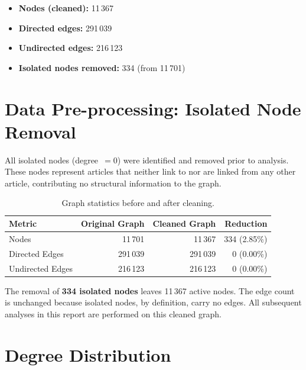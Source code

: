 \documentclass[12pt,a4paper]{article}
\begin{document}
\begin{itemize}
    \item \textbf{Nodes (cleaned):} 11\,367
    \item \textbf{Directed edges:} 291\,039
    \item \textbf{Undirected edges:} 216\,123
    \item \textbf{Isolated nodes removed:} 334 (from 11\,701)
\end{itemize}

\section{Data Pre-processing: Isolated Node Removal}

All isolated nodes (degree~$= 0$) were identified and removed prior to analysis.
These nodes represent articles that neither link to nor are linked from any other
article, contributing no structural information to the graph.

\begin{table}[H]
\centering
\caption{Graph statistics before and after cleaning.}
\label{tab:cleaning}
\begin{tabular}{lrrr}
\toprule
\textbf{Metric} & \textbf{Original Graph} & \textbf{Cleaned Graph} & \textbf{Reduction} \\
\midrule
Nodes & 11\,701 & 11\,367 & 334 (2.85\%) \\
Directed Edges & 291\,039 & 291\,039 & 0 (0.00\%) \\
Undirected Edges & 216\,123 & 216\,123 & 0 (0.00\%) \\
\bottomrule
\end{tabular}
\end{table}

The removal of \textbf{334 isolated nodes} leaves 11\,367 active nodes.  The edge
count is unchanged because isolated nodes, by definition, carry no edges.  All
subsequent analyses in this report are performed on this cleaned graph.

\section{Degree Distribution}
\end{document}

